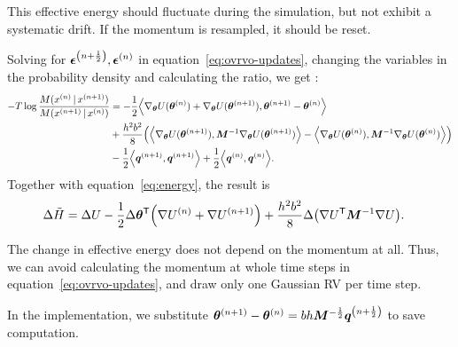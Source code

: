 \documentclass{article}
\newcommand{\gradat}[1]{{\nabla_\vtheta U(\vtheta\ssup{#1})}}
\begin{document}
This effective energy should fluctuate during the simulation, but not exhibit a
systematic drift. If the momentum is resampled, it should be reset.

Solving for ${\boldsymbol\epsilon}^{{\left( n+\frac{1}{2} \right)}}, {\boldsymbol\epsilon}^{{\left( n \right)}}$ in
equation~\ref{eq:ovrvo-updates}, changing the variables in the probability density and
calculating the ratio, we get \citep{bussi-parrinello}:
\begin{align*}
  -T\log \frac{M(x\ssup{n} \vbar x\ssup{n+1})}
  {M(x\ssup{n+1} \vbar x\ssup{n})}
  &=
    -\frac{1}{2}\angbra{\gradat{n} + \gradat{n+1}, \vtheta\ssup{n+1} - \vtheta\ssup{n}} \\
  &+ \frac{h^2b^2}{8}\bra{\angbra{\gradat{n+1}, \vM^{-1}\gradat{n+1}} - \angbra{\gradat{n}, \vM^{-1}\gradat{n}}} \\
  &- \frac{1}{2}\angbra{\vq\ssup{n+1}, \vq\ssup{n+1}} + \frac{1}{2}\angbra{\vq\ssup{n}, \vq\ssup{n}}.
\end{align*}
Together with equation~\ref{eq:energy}, the result is
\begin{align*}
  \Delta\tilde{H} &= \Delta U -\frac{1}{2}\Delta{\boldsymbol\theta}^{\mathsf{T}} {\left( \nabla U^{{\left( n \right)}} + \nabla U^{{\left( n+1 \right)}} \right)}
                    + \frac{h^2b^2}{8}\Delta{\left( \nabla U^{\mathsf{T}}{\bm{M}}^{-1}\nabla U \right)}.
\end{align*}

The change in effective energy does not depend on the momentum at all. Thus, we
can avoid calculating the momentum at whole time steps in
equation~\ref{eq:ovrvo-updates}, and draw only one Gaussian RV per time step.

In the implementation, we substitute ${\boldsymbol\theta}^{{\left( n+1 \right)}} - {\boldsymbol\theta}^{{\left( n \right)}} = b h
{\bm{M}}^{-\frac{1}{2}}{\bm{q}}^{{\left( n+\frac{1}{2} \right)}}$ to save computation.

\printbibliography
\end{document}
